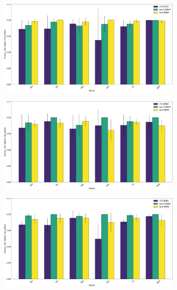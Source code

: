 \begin{figure}[!ht]
	\centering
	\begin{subfigure}{0.49\linewidth}
		\includegraphics[width=\linewidth]{img/An_Bn_Cnmod_ta.png}
		\subcaption{\an, \bn, \cnmod}
	\end{subfigure}
	\begin{subfigure}{0.49\linewidth}
		\includegraphics[width=\linewidth]{img/An_Bn_Phi_ta.png}
		\subcaption{\an, \bn, \phin}
	\end{subfigure}
	\begin{subfigure}{0.49\linewidth}
		\includegraphics[width=\linewidth]{img/An_Cnmod_Phi_ta.png}

\end{subfigure}
\end{figure}
